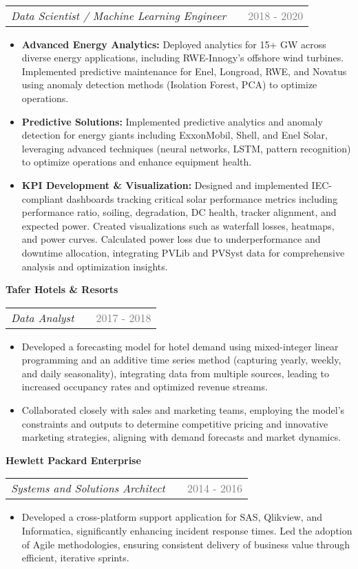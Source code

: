 \documentclass[a4paper,12pt]{article}
\makeatletter
\newenvironment{joblong}[3]
    {
    \noindent\textbf{\large #1}\\ %
    \begin{tabularx}{\linewidth}{@{}l X r@{}}
    \textit{#2} & &  {\textcolor{gray}{#3}} \\[3.75pt] %
    \end{tabularx}
    \begin{minipage}[t]{\linewidth}
    \begin{itemize}[nosep,after=\strut, leftmargin=1em, itemsep=3pt,label=--]
    }
    {
    \end{itemize}
    \end{minipage}    
    }
\makeatother
\begin{document}
\begin{joblong}{}{Data Scientist / Machine Learning Engineer}{2018 - 2020}
    \item \textbf{Advanced Energy Analytics:} Deployed analytics for 15+ GW across diverse energy applications, including RWE-Innogy's offshore wind turbines. Implemented predictive maintenance for Enel, Longroad, RWE, and Novatus using anomaly detection methods (Isolation Forest, PCA) to optimize operations.
    \item \textbf{Predictive Solutions:} Implemented predictive analytics and anomaly detection for energy giants including ExxonMobil, Shell, and Enel Solar, leveraging advanced techniques (neural networks, LSTM, pattern recognition) to optimize operations and enhance equipment health.
    \item \textbf{KPI Development \& Visualization:} Designed and implemented IEC-compliant dashboards tracking critical solar performance metrics including performance ratio, soiling, degradation, DC health, tracker alignment, and expected power. Created visualizations such as waterfall losses, heatmaps, and power curves. Calculated power loss due to underperformance and downtime allocation, integrating PVLib and PVSyst data for comprehensive analysis and optimization insights.
\end{joblong}

\begin{joblong}{Tafer Hotels \&  Resorts }{Data Analyst}{2017 - 2018}
    \item Developed a forecasting model for hotel demand using mixed-integer linear programming and an additive time series method (capturing yearly, weekly, and daily seasonality), integrating data from multiple sources, leading to increased occupancy rates and optimized revenue streams.
    \item Collaborated closely with sales and marketing teams, employing the model's constraints and outputs to determine competitive pricing and innovative marketing strategies, aligning with demand forecasts and market dynamics.
\end{joblong}

\begin{joblong}{Hewlett Packard Enterprise}{Systems and Solutions Architect}{2014 - 2016}
    \item Developed a cross-platform support application for SAS, Qlikview, and Informatica, significantly enhancing incident response times. Led the adoption of Agile methodologies, ensuring consistent delivery of business value through efficient, iterative sprints.
\end{joblong}
    
\end{document}
